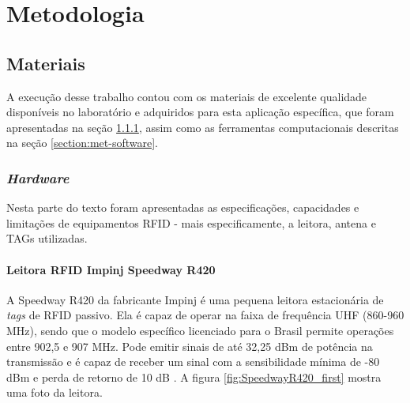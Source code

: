 
\chapter{Metodologia\label{chap:Metodos}}



\section{Materiais}

A execução desse trabalho contou com os materiais de excelente qualidade disponíveis no laboratório e adquiridos para esta aplicação específica, que foram apresentadas na seção \ref{section:met-hardware}, assim como as ferramentas computacionais descritas na seção \ref{section:met-software}.

\subsection{\textit{Hardware}} \label{section:met-hardware}

Nesta parte do texto foram apresentadas as especificações, capacidades e limitações de equipamentos RFID - mais especificamente, a leitora, antena e TAGs utilizadas.

\subsubsection{Leitora RFID Impinj Speedway R420} \label{section:met-leitora}

A Speedway R420 da fabricante Impinj é uma pequena leitora estacionária de \textit{tags} de RFID passivo. Ela é capaz de operar na faixa de frequência UHF (860-960 MHz), sendo que o modelo específico licenciado para o Brasil permite operações entre 902,5 e 907 MHz. Pode emitir sinais de até 32,25 dBm de potência na transmissão e é capaz de receber um sinal com a sensibilidade mínima de -80 dBm e perda de retorno de 10 dB \cite{SpeedwayRDatasheet} \cite{SpeedwayRUserManual} \cite{TG2013OliveiraERocha}. A figura \ref{fig:SpeedwayR420_first} mostra uma foto da leitora.

